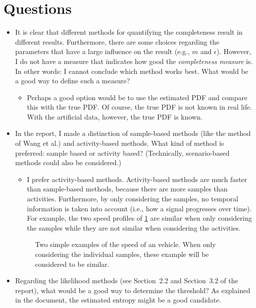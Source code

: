 \documentclass[10pt,final,a4paper,oneside,onecolumn]{article}
\newlength\figurewidth
\newlength\figureheight
\begin{document}
\section{Questions}

\begin{itemize}
	\item It is clear that different methods for quantifying the completeness result in different results. Furthermore, there are some choices regarding the parameters that have a large influence on the result (e.g., $m$ and $\epsilon$). However, I do not have a measure that indicates how good the \emph{completeness measure} is. In other words: I cannot conclude which method works best. What would be a good way to define such a measure?
	\begin{itemize}
		\item Perhaps a good option would be to use the estimated PDF and compare this with the true PDF. Of course, the true PDF is not known in real life. With the artificial data, however, the true PDF is known.
	\end{itemize}
	\item In the report, I made a distinction of sample-based methods (like the method of Wang et al.) and activity-based methods. What kind of method is preferred: sample based or activity based? (Technically, scenario-based methods could also be considered.)
	\begin{itemize}
		\item I prefer activity-based methods. Activity-based methods are much faster than sample-based methods, because there are more samples than activities. Furthermore, by only considering the samples, no temporal information is taken into account (i.e., how a signal progresses over time). For example, the two speed profiles of \cref{fig:speed example} are similar when only considering the samples while they are not similar when considering the activities.
	\end{itemize}
	\begin{figure}
		\centering
		\setlength{}
		\setlength{}
		\begin{minipage}{0.46\linewidth}
			\centering
			
		\end{minipage}
		\hspace{0.04\linewidth}
		\begin{minipage}{0.46\linewidth}
			
		\end{minipage}
		\caption{Two simple examples of the speed of an vehicle. When only considering the individual samples, these example will be considered to be similar.}
		\label{fig:speed example}
	\end{figure}
	\item Regarding the likelihood methods (see Section~2.2 and Section~3.2 of the report), what would be a good way to determine the threshold? As explained in the document, the estimated entropy might be a good candidate. 
\end{itemize}


\printbibliography


\newpage

\end{document}
